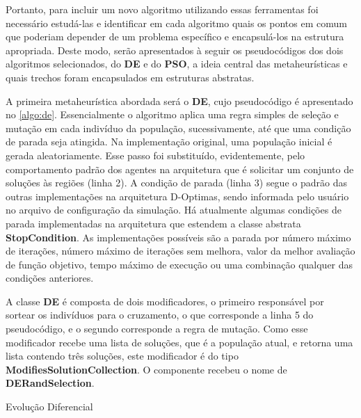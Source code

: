 Portanto, para incluir um novo algoritmo utilizando essas ferramentas foi necessário estudá-las e identificar em cada algoritmo quais os pontos em comum que poderiam depender de um problema específico e encapsulá-los na estrutura apropriada. Deste modo, serão apresentados à seguir os pseudocódigos dos dois algoritmos selecionados, do \textbf{DE} e do \textbf{PSO}, a ideia central das metaheurísticas e quais trechos foram encapsulados em estruturas abstratas.

A primeira metaheurística abordada será o \textbf{DE}, cujo pseudocódigo é apresentado no \autoref{algo:de}. Essencialmente o algoritmo aplica uma regra simples de seleção e mutação em cada indivíduo da população, sucessivamente, até que uma condição de parada seja atingida. Na implementação original, uma população inicial é gerada aleatoriamente. Esse passo foi substituído, evidentemente, pelo comportamento padrão dos agentes na arquitetura que é solicitar um conjunto de soluções às regiões (linha 2). A condição de parada (linha 3) segue o padrão das outras implementações na arquitetura D-Optimas, sendo informada pelo usuário no arquivo de configuração da simulação. Há atualmente algumas condições de parada implementadas na arquitetura que estendem a classe abstrata \textbf{StopCondition}. As implementações possíveis são a parada por número máximo de iterações, número máximo de iterações sem melhora, valor da melhor avaliação de função objetivo, tempo máximo de execução ou uma combinação qualquer das condições anteriores. 

A classe \textbf{DE} é composta de dois modificadores, o primeiro responsável por sortear os indivíduos para o cruzamento, o que corresponde a linha 5 do pseudocódigo, e o segundo corresponde a regra de mutação. Como esse modificador recebe uma lista de soluções, que é a população atual, e retorna uma lista contendo três soluções, este modificador é do tipo \textbf{ModifiesSolutionCollection}. O componente recebeu o nome de \textbf{DERandSelection}. 

\begin{algorithm}[H]
\caption{Evolução Diferencial}
\label{algo:de}
\begin{algorithmic}[1]
    \State {} 
                \Else
                \EndIf
            \EndFor
        \EndFor
        
            \Else
            \EndIf
        \EndFor
    \EndWhile
\end{algorithmic}
\end{algorithm}


